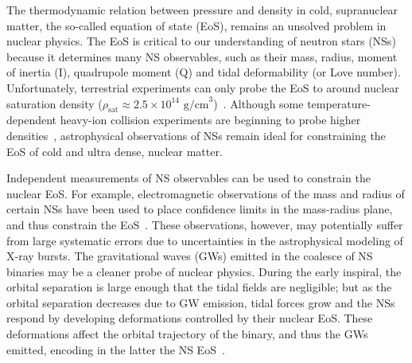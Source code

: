 \documentclass[prd,twocolumn,nofootinbib,superscriptaddress,amsmath,amssymb]{revtex4-1}
\begin{document}
The thermodynamic relation between pressure and density in cold, supranuclear matter, the so-called equation of state (EoS), remains an unsolved problem in nuclear physics. The EoS is critical to our understanding of neutron stars (NSs) because it determines many NS observables, such as their mass, radius, moment of inertia (I), quadrupole moment (Q) and tidal deformability (or Love number). Unfortunately, terrestrial experiments can only probe the EoS to around nuclear saturation density ($\rho_{\text{sat}} \approx 2.5 \times 10^{14} \text{ g/cm}^3$)~\cite{Li:HeavyIon,Tsang:SymmetryEnergy,Centelles:NeutronSkin,Li:CrossSections,Chen:SymEnergy}. Although some temperature-dependent heavy-ion collision experiments are beginning to probe higher densities~\cite{Danielewicz:2002pu}, astrophysical observations of NSs remain ideal for constraining the EoS of cold and ultra dense, nuclear matter.

Independent measurements of NS observables can be used to constrain the nuclear EoS. For example, electromagnetic observations of the mass and radius of certain NSs have been used to place confidence limits in the mass-radius plane, and thus constrain the EoS~\cite{guver,ozel-baym-guver,steiner-lattimer-brown,Lattimer2014,Ozel:2016oaf}. These observations, however, may potentially suffer from large systematic errors due to uncertainties in the astrophysical modeling of X-ray bursts. The gravitational waves (GWs) emitted in the coalesce of NS binaries may be a cleaner probe of nuclear physics. During the early inspiral, the orbital separation is large enough that the tidal fields are negligible; but as the orbital separation decreases due to GW emission, tidal forces grow and the NSs respond by developing deformations controlled by their nuclear EoS. These deformations affect the orbital trajectory of the binary, and thus the GWs emitted, encoding in the latter the NS EoS~\cite{hinderer-love,Flanagan2008}.
\end{document}
